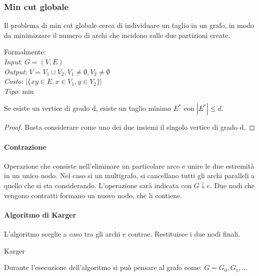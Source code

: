 \subsubsection{Min cut globale}
Il problema di min cut globale cerca di individuare un taglio in un grafo, 
in modo da minimizzare il numero di archi che incidono sulle due partizioni create.

Formalmente:\\
\emph{Input}: $G=(V,E)$\\
\emph{Output}: $V = V_1 \cup V_2, V_1 \neq \emptyset, V_2 \neq \emptyset$\\
\emph{Costo}: $|\{xy \in E, x \in V_1, y \in V_2\}|$\\
\emph{Tipo}: min

\begin{lemma}
    Se esiste un vertice di grado d, esiste un taglio minimo $E^*$ con $|E^*| \leq d$.
\end{lemma}
\begin{proof}
    Basta considerare come uno dei due insiemi il singolo vertice di grado d.
\end{proof}

\paragraph{Contrazione}
Operazione che consiste nell'eliminare un particolare arco e unire le due estremità in un unico nodo.
Nel caso si un multigrafo, si cancellano tutti gli archi paralleli a quello che si sta considerando.
L'operazione sarà indicata con $G \downarrow e$. Due nodi che vengono contratti formano un nuovo 
nodo, che li contiene.

\paragraph{Algoritmo di Karger}
L'algoritmo sceglie a caso tra gli archi e contrae.
Restituisce i due nodi finali.

\begin{algorithm}[H]
    \SetAlgoLined
     \caption{Karger}
\end{algorithm}

Durante l'esecuzione dell'algoritmo si può pensare al grafo come: $G = G_0, G_1, \dots$


